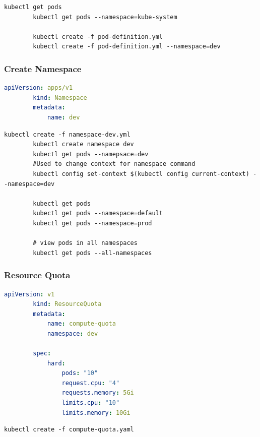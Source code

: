 \documentclass[11pt]{book}
\begin{document}
    \begin{lstlisting}[language=terminal,caption={Pod commands}]
        kubectl get pods
        kubectl get pods --namespace=kube-system

        kubectl create -f pod-definition.yml
        kubectl create -f pod-definition.yml --namespace=dev
    \end{lstlisting}

    \subsubsection{Create Namespace}

    \begin{lstlisting}[language=yaml, caption={Replication Set}]
        apiVersion: apps/v1
        kind: Namespace
        metadata:
            name: dev
    \end{lstlisting}

    \begin{lstlisting}[language=terminal,caption={Pod commands}]
        kubectl create -f namespace-dev.yml
        kubectl create namespace dev
        kubectl get pods --namepsace=dev
        #Used to change context for namespace command
        kubectl config set-context $(kubectl config current-context) --namespace=dev

        kubectl get pods
        kubectl get pods --namespace=default
        kubectl get pods --namespace=prod

        # view pods in all namespaces
        kubectl get pods --all-namespaces
    \end{lstlisting}

    \subsubsection{Resource Quota}
    \begin{lstlisting}[language=yaml, caption={Replication Set}]
        apiVersion: v1
        kind: ResourceQuota
        metadata:
            name: compute-quota
            namespace: dev

        spec:
            hard:
                pods: "10"
                request.cpu: "4"
                requests.memory: 5Gi
                limits.cpu: "10"
                limits.memory: 10Gi
    \end{lstlisting}

    \begin{lstlisting}[language=terminal,caption={Pod commands}]
        kubectl create -f compute-quota.yaml
    \end{lstlisting}
\end{document}
